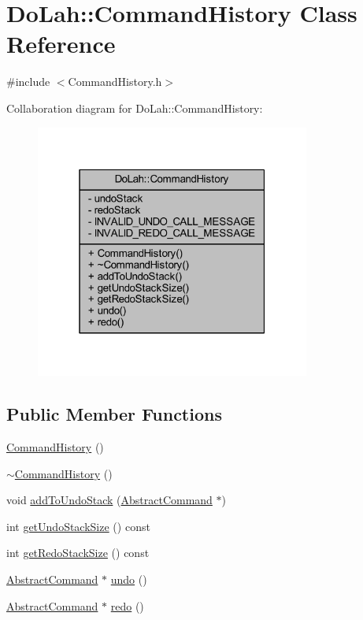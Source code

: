 \hypertarget{class_do_lah_1_1_command_history}{}\section{Do\+Lah\+:\+:Command\+History Class Reference}
\label{class_do_lah_1_1_command_history}


{\ttfamily \#include $<$Command\+History.\+h$>$}



Collaboration diagram for Do\+Lah\+:\+:Command\+History\+:\nopagebreak
\begin{figure}[H]
\begin{center}
\leavevmode
\includegraphics[width=256pt]{class_do_lah_1_1_command_history__coll__graph}
\end{center}
\end{figure}
\subsection*{Public Member Functions}
\begin{DoxyCompactItemize}
\item 
\hyperlink{class_do_lah_1_1_command_history_a3043a7b3d26409243270f85d0f9e3817}{Command\+History} ()
\item 
\hyperlink{class_do_lah_1_1_command_history_a475754a1e316ccf4df7281b16ff4a68c}{$\sim$\+Command\+History} ()
\item 
void \hyperlink{class_do_lah_1_1_command_history_a6c2ca1c4dcda54fea643c3cd8cff1fd2}{add\+To\+Undo\+Stack} (\hyperlink{class_do_lah_1_1_abstract_command}{Abstract\+Command} $\ast$)
\item 
int \hyperlink{class_do_lah_1_1_command_history_a244773421e301208b5d9d5f9fdc6d9de}{get\+Undo\+Stack\+Size} () const 
\item 
int \hyperlink{class_do_lah_1_1_command_history_a9358078e4d016efb55f0e2e3e3de14e3}{get\+Redo\+Stack\+Size} () const 
\item 
\hyperlink{class_do_lah_1_1_abstract_command}{Abstract\+Command} $\ast$ \hyperlink{class_do_lah_1_1_command_history_aa4a061dcb6f1150acb10cf3bb37e5aba}{undo} ()
\item 
\hyperlink{class_do_lah_1_1_abstract_command}{Abstract\+Command} $\ast$ \hyperlink{class_do_lah_1_1_command_history_aae2728781861917fd44b1fd133a51886}{redo} ()
\end{DoxyCompactItemize}
